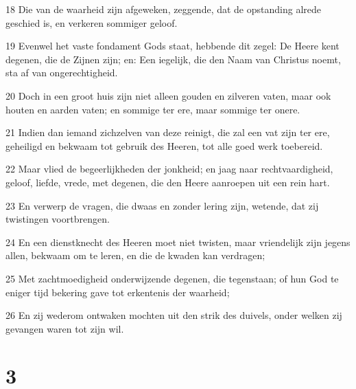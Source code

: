 \par 18 Die van de waarheid zijn afgeweken, zeggende, dat de opstanding alrede geschied is, en verkeren sommiger geloof.
\par 19 Evenwel het vaste fondament Gods staat, hebbende dit zegel: De Heere kent degenen, die de Zijnen zijn; en: Een iegelijk, die den Naam van Christus noemt, sta af van ongerechtigheid.
\par 20 Doch in een groot huis zijn niet alleen gouden en zilveren vaten, maar ook houten en aarden vaten; en sommige ter ere, maar sommige ter onere.
\par 21 Indien dan iemand zichzelven van deze reinigt, die zal een vat zijn ter ere, geheiligd en bekwaam tot gebruik des Heeren, tot alle goed werk toebereid.
\par 22 Maar vlied de begeerlijkheden der jonkheid; en jaag naar rechtvaardigheid, geloof, liefde, vrede, met degenen, die den Heere aanroepen uit een rein hart.
\par 23 En verwerp de vragen, die dwaas en zonder lering zijn, wetende, dat zij twistingen voortbrengen.
\par 24 En een dienstknecht des Heeren moet niet twisten, maar vriendelijk zijn jegens allen, bekwaam om te leren, en die de kwaden kan verdragen;
\par 25 Met zachtmoedigheid onderwijzende degenen, die tegenstaan; of hun God te eniger tijd bekering gave tot erkentenis der waarheid;
\par 26 En zij wederom ontwaken mochten uit den strik des duivels, onder welken zij gevangen waren tot zijn wil.

\chapter{3}

